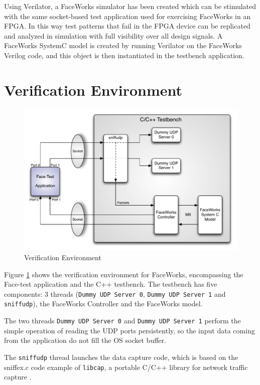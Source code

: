 \documentclass[defaultstyle,10pt,master,Helvetica]{thesis}
\begin{document}
Using Verilator, a FaceWorks simulator has been created which can be stimulated with the same socket-based test application used for exercising FaceWorks in an FPGA. In this way test patterns that fail in the FPGA device can be replicated and analyzed in simulation with full visibility over all design signals. A FaceWorks SystemC model is created by running Verilator on the FaceWorks Verilog code, and this object is then instantiated in the testbench application.

\section{Verification Environment}


\begin{figure}[h]
  \centering
      \includegraphics[scale=1,center]{Diagrams/TestBench-Diag.pdf}
  \caption{Verification Environment}\label{fig:tbschem}
\end{figure}


Figure \ref{fig:tbschem} shows the verification environment for FaceWorks, encompassing the Face-test application and the C++ testbench. The testbench has five components: 3 threads (\texttt{Dummy UDP Server 0}, \texttt{Dummy UDP Server 1} and {\tt sniffudp}), the FaceWorks Controller and the FaceWorks model.

The two threads \texttt{Dummy UDP Server 0} and \texttt{Dummy UDP Server 1} perform the simple operation of reading the \ac{UDP} ports persistently, so the input data coming from the application do not fill the OS socket buffer.

The {\tt sniffudp} thread launches the data capture code, which is based on the sniffex.c code example of {\tt libcap}, a portable C/C++ library for network traffic capture \cite{sniffer}. 
\end{document}
